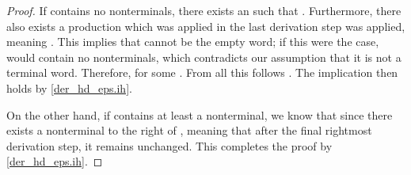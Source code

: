 \begin{isabellebody}
\begin{isamarkuptext}
\begin{lemma}
\begin{proof}
If \isa{{\isasymdelta}} contains no nonterminals, there exists an  such that . Furthermore, 
there also exists a production  which was applied in the last derivation 
step was applied, meaning . This implies that \isa{{\isasymchi}} cannot be the empty word; 
if this were the case,  would contain no nonterminals, which contradicts our assumption 
that it is not a terminal word. Therefore,  for some . From all this 
follows .
The implication then holds by \eqref{der_hd_eps.ih}.

On the other hand, if \isa{{\isasymdelta}} contains at least a nonterminal, we know that  since there
exists a nonterminal to the right of , meaning that after the final rightmost derivation step,
it remains unchanged. This completes the proof by \eqref{der_hd_eps.ih}.
\end{proof}
\end{lemma}


\end{isamarkuptext}
\end{isabellebody}
